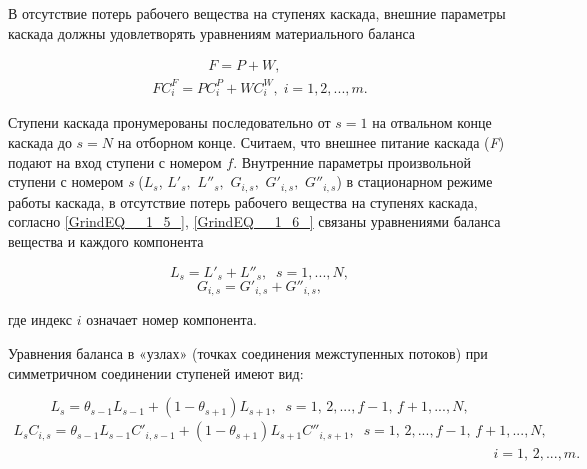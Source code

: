 В отсутствие потерь рабочего вещества на ступенях каскада, внешние параметры каскада должны удовлетворять уравнениям материального баланса

\begin{equation} \label{GrindEQ__1_21_} 
  \begin{array}{l} {\quad \quad \quad \quad F=P+W,} \\ {FC_{i}^{F} =PC_{i}^{P} +WC_{i}^{W} ,\; i=1,2,...,m.} \end{array} 
\end{equation} 

Ступени каскада пронумерованы последовательно от $s=1$ на отвальном конце каскада до $s=N$ на отборном конце. Считаем, что внешнее питание каскада (\textit{F}) подают на вход ступени с номером $f$. Внутренние параметры произвольной ступени с номером \textit{s} ($L_{s} $, $L'_{s} ,$ $L''_{s} ,$ $G_{i,s} ,$ $G'_{i,s} ,$ $G''_{i,s} $) в стационарном режиме работы каскада, в отсутствие потерь рабочего вещества на ступенях каскада, согласно  \ref{GrindEQ__1_5_},  \ref{GrindEQ__1_6_} связаны уравнениями баланса вещества и каждого компонента

\begin{equation} \label{GrindEQ__1_22_} 
  L_{s} =L'_{s} +L''_{s} ,\; \; s=1,...,N,            
  \end{equation} 
  \begin{equation} \label{GrindEQ__1_23_} 
  G_{i,s} =G'_{i,s} +G''_{i,s} ,           
  \end{equation} 

где индекс $i$ означает номер компонента.

Уравнения баланса в «узлах» (точках соединения межступенных потоков) при симметричном соединении ступеней имеют вид:

\begin{equation} \label{GrindEQ__1_24_} 
  L_{s} =\theta _{s-1} L_{s-1} +(1-\theta _{s+1} )L_{s+1} ,\; \; s=1,\, 2,...,f-1,\, f+1,...,N, 
  \end{equation} 
  \begin{equation} \label{GrindEQ__1_25_} 
  \begin{array}{l} {L_{s} C_{i,s} =\theta _{s-1} L_{s-1} C'_{i,s-1} +(1-\theta _{s+1} )L_{s+1} C''_{i,s+1} ,\; \; s=1,\, 2,...,f-1,\, f+1,...,N,} \\ {\; \; \; \; \; \; \; \; \; \; \; \; \; \; \; \; \; \; \; \; \; \; \; \; \; \; \; \; \; \; \; \; \; \quad \quad \quad \quad \quad \; \; \; \; \; \; \; \; \; \; \; \; \; \quad \quad \quad \; \; \; \; \; \; \; \; \; \; \; \; \; \quad \quad \quad \; \; \; \; \; \; \; \; \; \; \; \; \; \quad \quad \; \quad i=1,\, 2,...,m.} \end{array} 
  \end{equation} 

